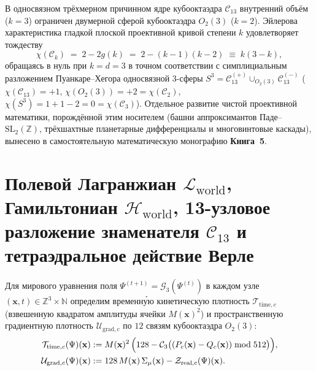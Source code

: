 В односвязном трёхмерном причинном ядре кубооктаэдра $\mathcal{C}_{13}$ внутренний объём ($k = 3$) ограничен двумерной сферой кубооктаэдра $O_2(3)$ ($k = 2$). Эйлерова характеристика гладкой плоской проективной кривой степени $k$ удовлетворяет тождеству
\begin{equation}
  \label{eq:mono-euler-curve-k}
  \chi(\mathcal{C}_k) \;=\; 2 - 2g(k) \;=\; 2 - (k - 1)(k - 2) \;\equiv\; k(3 - k),
\end{equation}
обращаясь в нуль при $k = d = 3$ в точном соответствии с симплициальным разложением Пуанкаре--Хегора односвязной 3-сферы $S^3 = \mathcal{C}_{13}^{(+)}\cup_{O_2(3)}\mathcal{C}_{13}^{(-)}$ ($\chi(\mathcal{C}_{13}) = +1$, $\chi(O_2(3)) = +2 = \chi(\mathcal{C}_2)$, $\chi(S^3) = 1 + 1 - 2 = 0 = \chi(\mathcal{C}_3)$). Отдельное развитие чистой проективной математики, порождённой этим носителем (башни аппроксимантов Паде--$\mathrm{SL}_2(\mathbb{Z})$, трёхшахтные планетарные дифференциалы и многовинтовые каскады), вынесено в самостоятельную математическую монографию \textbf{Книга~5}.

\section{Полевой Лагранжиан \texorpdfstring{$\mathcal{L}_{\mathrm{world}}$}{L\_world}, Гамильтониан \texorpdfstring{$\mathcal{H}_{\mathrm{world}}$}{H\_world}, 13-узловое разложение знаменателя \texorpdfstring{$\mathcal{C}_{13}$}{C13} и тетраэдральное действие Верле}
\label{sec:mono-world-lagrangian-hamiltonian}

Для мирового уравнения поля $\Psi^{(t+1)} = \mathcal{G}_3(\Psi^{(t)})$ в каждом узле $(\mathbf{x}, t) \in \mathbb{Z}^3 \times \mathbb{N}$ определим временну́ю кинетическую плотность $\mathcal{T}_{\mathrm{time},c}$ (взвешенную квадратом амплитуды ячейки $M(\mathbf{x})^2$) и пространственную градиентную плотность $\mathcal{U}_{\mathrm{grad},c}$ по $12$ связям кубооктаэдра $O_2(3)$:
\begin{align}
  \mathcal{T}_{\mathrm{time},c}(\Psi)(\mathbf{x}) &:= M(\mathbf{x})^2\,\Bigl(128 - \mathcal{C}_3\bigl((P_c(\mathbf{x}) - Q_c(\mathbf{x})) \bmod 512\bigr)\Bigr), \label{eq:mono-field-temporal-kinetic} \\
  \mathcal{U}_{\mathrm{grad},c}(\Psi)(\mathbf{x}) &:= 128\,M(\mathbf{x})\,\Sigma_\mu(\mathbf{x}) - \mathcal{Z}_{\mathrm{real},c}(\Psi)(\mathbf{x}). \label{eq:mono-field-spatial-potential}
\end{align}

